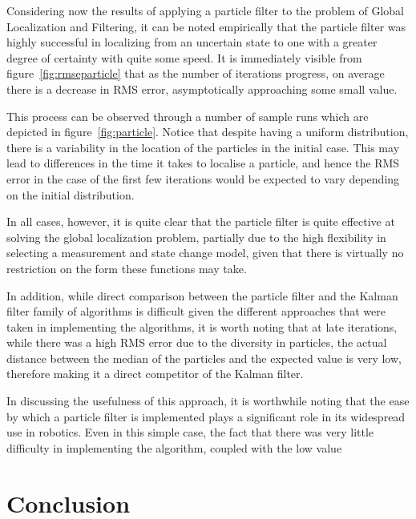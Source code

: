 \documentclass[english]{article}
\begin{document}
Considering now the results of applying a particle filter to the problem of Global Localization and Filtering, it can be noted empirically that the particle filter was highly successful in localizing from an uncertain state to one with a greater degree of certainty with quite some speed. It is immediately visible from figure~\ref{fig:rmseparticle} that as the number of iterations progress, on average there is a decrease in RMS error, asymptotically approaching some small value.

This process can be observed through a number of sample runs which are depicted in figure~\ref{fig:particle}. Notice that despite having a uniform distribution, there is a variability in the location of the particles in the initial case. This may lead to differences in the time it takes to localise a particle, and hence the RMS error in the case of the first few iterations would be expected to vary depending on the initial distribution.

In all cases, however, it is quite clear that the particle filter is quite effective at solving the global localization problem, partially due to the high flexibility in selecting a measurement and state change model, given that there is virtually no restriction on the form these functions may take.

In addition, while direct comparison between the particle filter and the Kalman filter family of algorithms is difficult given the different approaches that were taken in implementing the algorithms, it is worth noting that at late iterations, while there was a high RMS error due to the diversity in particles, the actual distance between the median of the particles and the expected value is very low, therefore making it a direct competitor of the Kalman filter.

In discussing the usefulness of this approach, it is worthwhile noting that the ease by which a particle filter is implemented plays a significant role in its widespread use in robotics. Even in this simple case, the fact that there was very little difficulty in implementing the algorithm, coupled with the low value




\section{Conclusion}



\end{document}
